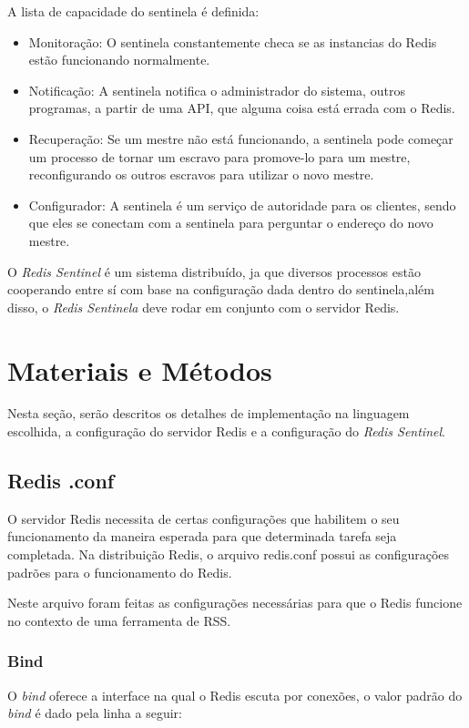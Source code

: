 \documentclass[10pt]{IEEEtran}
\begin{document}
A lista de capacidade do sentinela é definida:
\begin{itemize}
\item Monitoração: O sentinela constantemente checa se as instancias do Redis estão funcionando normalmente.
\item Notificação: A sentinela notifica o administrador do sistema, outros programas, a partir de uma API, que alguma coisa está errada com o Redis.
\item Recuperação: Se um mestre não está funcionando, a sentinela pode começar um processo de tornar um escravo para promove-lo para um mestre, reconfigurando os outros escravos para utilizar o novo mestre.
\item Configurador: A sentinela é um serviço de autoridade para os clientes, sendo que eles se conectam com a sentinela para perguntar o endereço do novo mestre.
\end{itemize}

O \textit{Redis Sentinel} é um sistema distribuído, ja que diversos processos estão cooperando entre sí com base na configuração dada dentro do sentinela,além disso, o \textit{Redis Sentinela} deve rodar em conjunto com o servidor Redis.

\section{Materiais e Métodos}
Nesta seção, serão descritos os detalhes de implementação na linguagem escolhida, a configuração do servidor Redis e a configuração do \textit{Redis Sentinel}.

\subsection{Redis .conf}

O servidor Redis necessita de certas configurações que habilitem o seu funcionamento da maneira esperada para que determinada tarefa seja completada. Na distribuição Redis, o arquivo redis.conf possui as configurações padrões para o funcionamento do Redis.

Neste arquivo foram feitas as configurações necessárias para que o Redis funcione no contexto de uma ferramenta de RSS.

\subsubsection{Bind}

O \textit{bind} oferece a interface na qual o Redis escuta por conexões, o valor padrão do \textit{bind} é dado pela linha a seguir:
\end{document}

